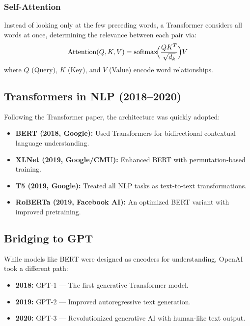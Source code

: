 \subsubsection{Self-Attention}

Instead of looking only at the few preceding words, a Transformer considers all words at once,
determining the relevance between each pair via:
\[
\mbox{Attention}(Q,K,V) = \mbox{softmax}\!\Bigl(\frac{QK^T}{\sqrt{d_k}}\Bigr)V
\]
where \(Q\) (Query), \(K\) (Key), and \(V\) (Value) encode word relationships.

\subsection{Transformers in NLP (2018--2020)}

Following the Transformer paper, the architecture was quickly adopted:
\begin{itemize}
  \item \textbf{BERT (2018, Google):} Used Transformers for bidirectional contextual
        language understanding.
  \item \textbf{XLNet (2019, Google/CMU):} Enhanced BERT with permutation-based training.
  \item \textbf{T5 (2019, Google):} Treated all NLP tasks as text-to-text transformations.
  \item \textbf{RoBERTa (2019, Facebook AI):} An optimized BERT variant with improved pretraining.
\end{itemize}

\subsection{Bridging to GPT}

While models like BERT were designed as encoders for understanding,
OpenAI took a different path:
\begin{itemize}
  \item \textbf{2018:} GPT-1 --- The first generative Transformer model.
  \item \textbf{2019:} GPT-2 --- Improved autoregressive text generation.
  \item \textbf{2020:} GPT-3 --- Revolutionized generative AI with human-like text output.
\end{itemize}


